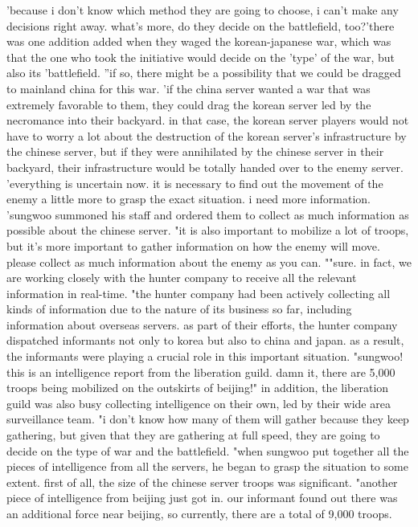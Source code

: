 'because i don't know which method they are going to choose, i can't make any decisions right away.
 what's more, do they decide on the battlefield, too?'there was one addition added when they waged the korean-japanese war, which was that the one who took the initiative would decide on the 'type' of the war, but also its 'battlefield.
''if so, there might be a possibility that we could be dragged to mainland china for this war.
'if the china server wanted a war that was extremely favorable to them, they could drag the korean server led by the necromance into their backyard.
in that case, the korean server players would not have to worry a lot about the destruction of the korean server's infrastructure by the chinese server, but if they were annihilated by the chinese server in their backyard, their infrastructure would be totally handed over to the enemy server.
'everything is uncertain now.
 it is necessary to find out the movement of the enemy a little more to grasp the exact situation.
 i need more information.
'sungwoo summoned his staff and ordered them to collect as much information as possible about the chinese server.
"it is also important to mobilize a lot of troops, but it's more important to gather information on how the enemy will move.
 please collect as much information about the enemy as you can.
""sure.
 in fact, we are working closely with the hunter company to receive all the relevant information in real-time.
"the hunter company had been actively collecting all kinds of information due to the nature of its business so far, including information about overseas servers.
as part of their efforts, the hunter company dispatched informants not only to korea but also to china and japan.
 as a result, the informants were playing a crucial role in this important situation.
 "sungwoo! this is an intelligence report from the liberation guild.
 damn it, there are 5,000 troops being mobilized on the outskirts of beijing!"
in addition, the liberation guild was also busy collecting intelligence on their own, led by their wide area surveillance team.
"i don't know how many of them will gather because they keep gathering, but given that they are gathering at full speed, they are going to decide on the type of war and the battlefield.
"when sungwoo put together all the pieces of intelligence from all the servers, he began to grasp the situation to some extent.
 first of all, the size of the chinese server troops was significant.
"another piece of intelligence from beijing just got in.
 our informant found out there was an additional force near beijing, so currently, there are a total of 9,000 troops.
